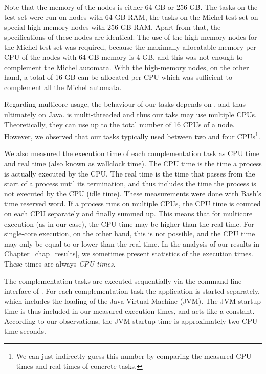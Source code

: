 Note that the memory of the nodes is either 64 GB or 256 GB. The tasks on the \goal{} test set were run on nodes with 64 GB RAM, the tasks on the Michel test set on special high-memory nodes with 256 GB RAM. Apart from that, the specifications of these nodes are identical. The use of the high-memory nodes for the Michel test set was required, because the maximally allocatable memory per CPU of the nodes with 64 GB memory is 4 GB, and this was not enough to complement the Michel automata. With the high-memory nodes, on the other hand, a total of 16 GB can be allocated per CPU which was sufficient to complement all the Michel automata.

Regarding multicore usage, the behaviour of our tasks depends on \goal, and thus ultimately on Java. \goal{} is multi-threaded and thus our taks may use  multiple CPUs. Theoretically, they can use up to the total number of 16 CPUs of a node. However, we observed that our tasks typically used between two and four CPUs\footnote{We can just indirectly guess this number by comparing the measured CPU times and real times of concrete tasks.}.

We also measured the execution time of each complementation task as CPU time and real time (also known as wallclock time). The CPU time is the time a process is actually executed by the CPU. The real time is the time that passes from the start of a process until its termination, and thus includes the time the process is not executed by the CPU (idle time). These measurements were done with Bash's \textsf{time} reserved word. If a process runs on multiple CPUs, the CPU time is counted on each CPU separately and finally summed up. This means that for multicore execution (as in our case), the CPU time may be higher than the real time. For single-core execution, on the other hand, this is not possible, and the CPU time may only be equal to or lower than the real time. In the analysis of our results in Chapter~\ref{chap_results}, we sometimes present statistics of the execution times. These times are always \textit{CPU times}.

The complementation tasks are executed sequentially via the command line interface of \goal. For each complementation task the \goal{} application is started separately, which includes the loading of the Java Virtual Machine (JVM). The JVM startup time is thus included in our measured execution times, and acts like a constant. According to our observations, the JVM startup time is approximately two CPU time seconds.

